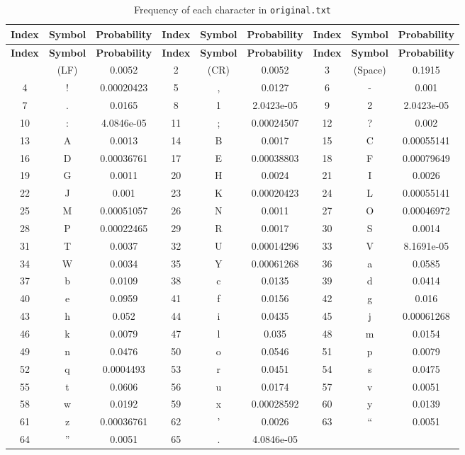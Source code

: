 \documentclass[12pt,twoside]{article}
\begin{document}
\begin{longtable}{ccc||ccc||ccc}
    \caption{Frequency of each character in \texttt{original.txt}}
    \label{tab:frequency} \\
    \toprule
    \textbf{Index} & \textbf{Symbol} & \textbf{Probability} & \textbf{Index} & \textbf{Symbol} & \textbf{Probability} & \textbf{Index} & \textbf{Symbol} & \textbf{Probability} \\ \hline
    \endfirsthead
    \hline
    \textbf{Index} & \textbf{Symbol} & \textbf{Probability} & \textbf{Index} & \textbf{Symbol} & \textbf{Probability} & \textbf{Index} & \textbf{Symbol} & \textbf{Probability} \\ \hline
    \endhead
    \hline
    \endfoot
    1 & (LF) & 0.0052 & 2 & (CR) & 0.0052 & 3 & (Space) & 0.1915 \\ 
    4 & ! & 0.00020423 & 5 & , & 0.0127 & 6 & - & 0.001 \\ 
    7 & . & 0.0165 & 8 & 1 & 2.0423e-05 & 9 & 2 & 2.0423e-05 \\ 
    10 & : & 4.0846e-05 & 11 & ; & 0.00024507 & 12 & ? & 0.002 \\ 
    13 & A & 0.0013 & 14 & B & 0.0017 & 15 & C & 0.00055141 \\ 
    16 & D & 0.00036761 & 17 & E & 0.00038803 & 18 & F & 0.00079649 \\ 
    19 & G & 0.0011 & 20 & H & 0.0024 & 21 & I & 0.0026 \\ 
    22 & J & 0.001 & 23 & K & 0.00020423 & 24 & L & 0.00055141 \\ 
    25 & M & 0.00051057 & 26 & N & 0.0011 & 27 & O & 0.00046972 \\ 
    28 & P & 0.00022465 & 29 & R & 0.0017 & 30 & S & 0.0014 \\ 
    31 & T & 0.0037 & 32 & U & 0.00014296 & 33 & V & 8.1691e-05 \\ 
    34 & W & 0.0034 & 35 & Y & 0.00061268 & 36 & a & 0.0585 \\ 
    37 & b & 0.0109 & 38 & c & 0.0135 & 39 & d & 0.0414 \\ 
    40 & e & 0.0959 & 41 & f & 0.0156 & 42 & g & 0.016 \\ 
    43 & h & 0.052 & 44 & i & 0.0435 & 45 & j & 0.00061268 \\ 
    46 & k & 0.0079 & 47 & l & 0.035 & 48 & m & 0.0154 \\ 
    49 & n & 0.0476 & 50 & o & 0.0546 & 51 & p & 0.0079 \\ 
    52 & q & 0.0004493 & 53 & r & 0.0451 & 54 & s & 0.0475 \\ 
    55 & t & 0.0606 & 56 & u & 0.0174 & 57 & v & 0.0051 \\ 
    58 & w & 0.0192 & 59 & x & 0.00028592 & 60 & y & 0.0139 \\ 
    61 & z & 0.00036761 & 62 & ’ & 0.0026 & 63 & “ & 0.0051 \\ 
    64 & ” & 0.0051 & 65 & . & 4.0846e-05 &  &  &  \\ 
    \toprule
\end{longtable}
\end{document}
